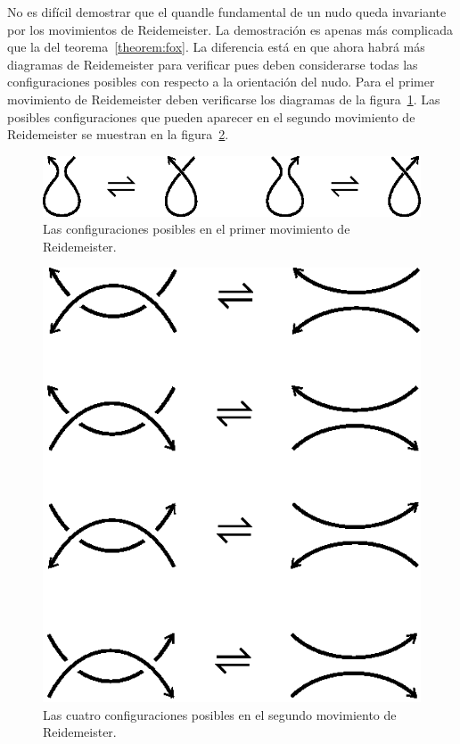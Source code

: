 \documentclass[graybox]{svmult}
\begin{document}
	\label{block:quandle_proof} No es difícil demostrar que el quandle
	fundamental de un nudo queda invariante por los movimientos de
	Reidemeister. La demostración es apenas más complicada que la del
	teorema~\ref{theorem:fox}. La diferencia está en que ahora habrá más diagramas
	de Reidemeister para verificar pues deben considerarse todas las
	configuraciones posibles con respecto a la orientación del nudo. 
    Para el primer movimiento de Reidemeister deben verificarse los diagramas de
    la figura~\ref{fig:oriented_R1}.
    Las posibles configuraciones que pueden aparecer en el segundo movimiento de
    Reidemeister se muestran en la figura~\ref{fig:oriented_R2}. 

    \begin{figure}[ht]
		\centering
        \includegraphics[scale=0.6]{images/oriented_R1}
        \caption{Las configuraciones posibles en el primer movimiento de Reidemeister.}
        \label{fig:oriented_R1}
    \end{figure}
	\begin{figure}[ht]
		\centering
        \includegraphics[scale=0.6]{images/oriented_R2}
        \caption{Las cuatro configuraciones posibles en el segundo movimiento de Reidemeister.}
        \label{fig:oriented_R2}
    \end{figure}
\end{document}
